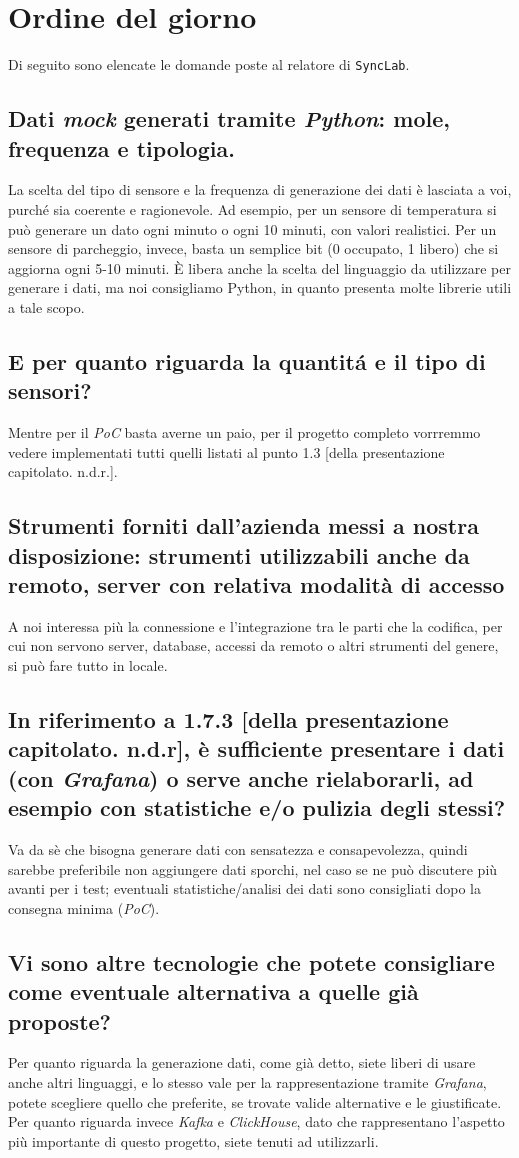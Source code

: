 \section{Ordine del giorno}
Di seguito sono elencate le domande poste al relatore di \texttt{SyncLab}.
\subsection{Dati \textit{mock} generati tramite \textit{Python}: mole, frequenza e tipologia.}
La scelta del tipo di sensore e la frequenza di generazione dei dati è lasciata a voi, purché sia coerente e ragionevole. Ad esempio, per un sensore di temperatura si può generare un dato ogni minuto o ogni 10 minuti, con valori realistici. Per un sensore di parcheggio, invece, basta un semplice bit (0 occupato, 1 libero) che si aggiorna ogni 5-10 minuti. È libera anche la scelta del linguaggio da utilizzare per generare i dati, ma noi consigliamo Python, in quanto presenta molte librerie utili a tale scopo.
\subsection{E per quanto riguarda la quantitá e il tipo di sensori?}
Mentre per il \textit{PoC} basta averne un paio, per il progetto completo vorrremmo vedere implementati tutti quelli listati al punto 1.3 [della presentazione capitolato. n.d.r.].
\subsection{Strumenti forniti dall'azienda messi a nostra disposizione: strumenti utilizzabili anche da remoto, server con relativa modalità di accesso}
A noi interessa più la connessione e l'integrazione tra le parti che la codifica, per cui non servono server, database, accessi da remoto o altri strumenti del genere, si può fare tutto in locale.
\subsection{In riferimento a 1.7.3 [della presentazione capitolato. n.d.r], è sufficiente presentare i dati (con \textit{Grafana}) o serve anche rielaborarli, ad esempio con statistiche e/o pulizia degli stessi?}
Va da sè che bisogna generare dati con sensatezza e consapevolezza, quindi sarebbe preferibile non aggiungere dati sporchi, nel caso se ne può discutere più avanti per i test; eventuali statistiche/analisi dei dati sono consigliati dopo la consegna minima (\textit{PoC}).
\subsection{Vi sono altre tecnologie che potete consigliare come eventuale alternativa a quelle già proposte?}
Per quanto riguarda la generazione dati, come già detto, siete liberi di usare anche altri linguaggi, e lo stesso vale per la rappresentazione tramite \textit{Grafana}, potete scegliere quello che preferite, se trovate valide alternative e le giustificate. Per quanto riguarda invece \textit{Kafka} e \textit{ClickHouse}, dato che rappresentano l'aspetto più importante di questo progetto, siete tenuti ad utilizzarli.
